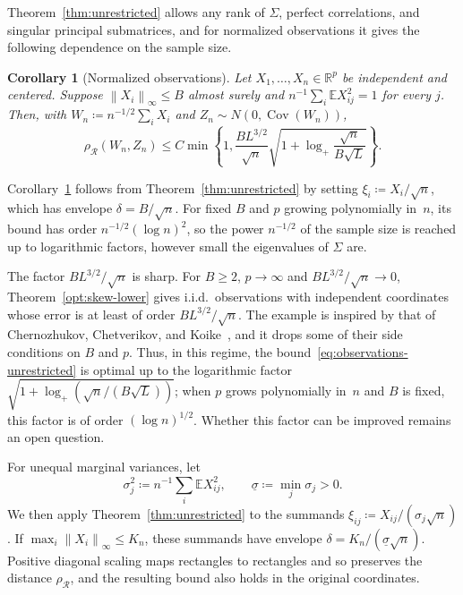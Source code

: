 \documentclass[11pt,letterpaper]{article}
\newtheorem{corollary}{Corollary}
\theoremstyle{remark}
\newcommand{\E}{\mathbb E}
\newcommand{\R}{\mathbb R}
\newcommand{\Cov}{\operatorname{Cov}}
\newcommand{\norm}[1]{\left\lVert#1\right\rVert}
\newcommand{\rh}{\rho_{\mathcal R}}
\begin{document}
Theorem~\ref{thm:unrestricted} allows any rank of \(\Sigma\), perfect
correlations, and singular principal submatrices, and for normalized
observations it gives the following dependence on the sample size.

\begin{corollary}[Normalized observations]\label{cor:observations}
Let \(X_1,\ldots,X_n\in\R^p\) be independent and centered. Suppose
\(\norm{X_i}_\infty\le B\) almost surely and
\(n^{-1}\sum_i\E X_{ij}^2=1\) for every \(j\). Then, with
\(W_n\coloneqq n^{-1/2}\sum_iX_i\) and \(Z_n\sim N(0,\Cov(W_n))\),
\begin{equation}
 \rh(W_n,Z_n)\le C\min\!\left\{1,
 \frac{B L^{3/2}}{\sqrt n}
 \sqrt{1+\log_+\frac{\sqrt n}{B\sqrt L}}\right\}.
 \label{eq:observations-unrestricted}
\end{equation}
\end{corollary}

Corollary~\ref{cor:observations} follows from Theorem~\ref{thm:unrestricted}
by setting \(\xi_i\coloneqq X_i/\sqrt n\), which has envelope \(\delta=B/\sqrt n\). For
fixed \(B\) and \(p\) growing polynomially in~\(n\), its bound has
order \(n^{-1/2}(\log n)^2\), so the power \(n^{-1/2}\) of the
sample size is reached up to logarithmic factors, however small the
eigenvalues of \(\Sigma\) are.

The factor \(BL^{3/2}/\sqrt n\) is sharp. For \(B\ge2\), \(p\to\infty\) and
\(BL^{3/2}/\sqrt n\to0\), Theorem~\ref{opt:skew-lower} gives i.i.d.\ observations
with independent coordinates whose error is at least of order
\(BL^{3/2}/\sqrt n\). The example is inspired by that of Chernozhukov,
Chetverikov, and Koike~\cite[Proposition~2.1]{CCK}, and it drops some of their
side conditions on \(B\) and \(p\). Thus, in this regime, the
bound~\eqref{eq:observations-unrestricted} is optimal up to the logarithmic
factor \(\sqrt{1+\log_+(\sqrt n/(B\sqrt L))}\); when \(p\) grows polynomially
in~\(n\) and \(B\) is fixed, this factor is of order \((\log n)^{1/2}\). Whether
this factor can be improved remains an open question.

For unequal marginal variances, let
\[
 \sigma_j^2\coloneqq n^{-1}\sum_i\E X_{ij}^2,
 \qquad
 \underline\sigma\coloneqq \min_j\sigma_j>0.
\]
We then apply Theorem~\ref{thm:unrestricted} to the summands
\(\xi_{ij}\coloneqq X_{ij}/(\sigma_j\sqrt n)\). If
\(\max_i\norm{X_i}_\infty\le K_n\), these summands have
envelope \(\delta=K_n/(\underline\sigma\sqrt n)\).
Positive diagonal scaling maps rectangles to rectangles and so preserves
the distance \(\rh\), and the resulting bound also holds in the
original coordinates.
\end{document}
